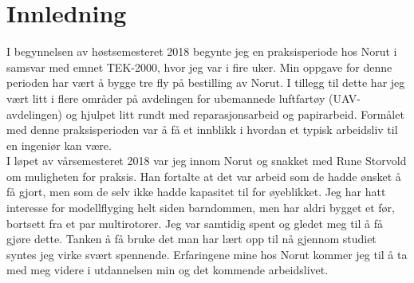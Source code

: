 \documentclass[12pt, a4paper]{article}
\begin{document}
\section{Innledning}
I begynnelsen av høstsemesteret 2018 begynte jeg en praksisperiode hos Norut i samsvar med emnet TEK-2000, hvor jeg var i fire uker. Min oppgave for denne perioden har vært å bygge tre fly på bestilling av Norut. I tillegg til dette har jeg vært litt i flere områder på avdelingen for ubemannede luftfartøy (UAV-avdelingen) og hjulpet litt rundt med reparasjonsarbeid og papirarbeid. Formålet med denne praksisperioden var å få et innblikk i hvordan et typisk arbeidsliv til en ingeniør kan være. \\

I løpet av vårsemesteret 2018 var jeg innom Norut og snakket med Rune Storvold om muligheten for praksis. Han fortalte at det var arbeid som de hadde ønsket å få gjort, men som de selv ikke hadde kapasitet til for øyeblikket. Jeg har hatt interesse for modellflyging helt siden barndommen, men har aldri bygget et før, bortsett fra et par multirotorer. Jeg var samtidig spent og gledet meg til å få gjøre dette. Tanken å få bruke det man har lært opp til nå gjennom studiet syntes jeg virke svært spennende. Erfaringene mine hos Norut kommer jeg til å ta med meg videre i utdannelsen min og det kommende arbeidslivet. 





\end{document}
